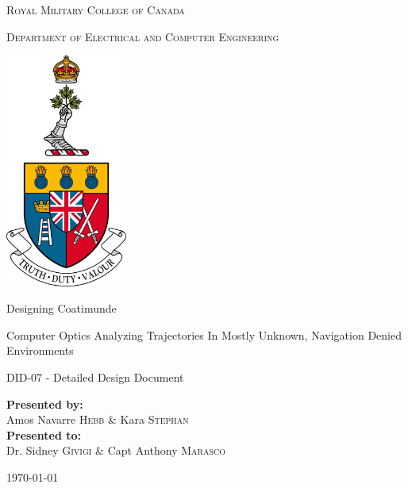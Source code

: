 \documentclass{article}[12]
\begin{document}
	
\begin{titlepage}
	\begin{center}
		\vspace*{1cm}
		
		\LARGE\textsc{Royal Military College of Canada}\normalsize
		
		\vspace{0.2cm}
		
		\textsc{Department of Electrical and Computer Engineering}
		
		\vspace{1.5cm}
		
		\includegraphics[width=0.3\textwidth]{rmcLogo.png}
		
		\vspace{1.5cm}
		
		\LARGE{Designing Coatimunde\\}
		
		\vspace{0.2cm}
		
		\normalsize{Computer Optics Analyzing Trajectories In Mostly Unknown, Navigation Denied Environments}
		
		\vspace{0.1cm}
		
		\normalsize{DID-07 - Detailed Design Document}
		
		\vfill
		
		\textbf{Presented by:}\\Amos Navarre \textsc{Hebb} \& Kara \textsc{Stephan}\\
		\vspace{0.8cm}
		\textbf{Presented to:}\\Dr. Sidney \textsc{Givigi} \& Capt Anthony \textsc{Marasco} 
		\vspace{0.8cm}
		
		\today
		
	\end{center}
\end{titlepage}
\end{document}
